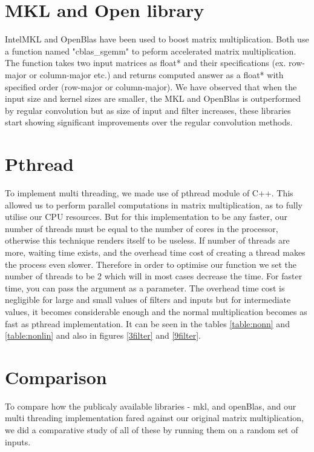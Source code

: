 \documentclass[a4paper]{article}
\begin{document}
\section{MKL and Open library}
IntelMKL and OpenBlas have been used to boost matrix multiplication. Both use a function named "cblas_sgemm" to peform accelerated matrix multiplication. The function takes two input matrices as float* and their specifications (ex. row-major or column-major etc.) and returns computed answer as a float* with specified order (row-major or column-major).
We have observed that when the input size and kernel sizes are smaller, the MKL and OpenBlas is outperformed by regular convolution but as size of input and filter increases, these libraries start showing significant improvements over the regular convolution methods. 




\section{Pthread}
To implement multi threading, we made use of pthread module of C++. This allowed us to perform parallel computations in matrix multiplication, as to fully utilise our CPU resources. But for this implementation to be any faster, our number of threads must be equal to the number of cores in the processor, otherwise this technique renders itself to be useless. If number of threads are more, waiting time exists, and the overhead time cost of creating a thread makes the process even slower. Therefore in order to optimise our function we set the number of threads to be 2 which will in most cases decrease the time. For faster time, you can pass the argument as a parameter.
The overhead time cost is negligible for large and small values of filters and inputs but for intermediate values, it becomes considerable enough and the normal multiplication becomes as fast as pthread implementation. It can be seen in the tables \ref{table:nonn} and \ref{table:nonlin} and also in figures \ref{3filter} and \ref{9filter}.


\section{Comparison}
To compare how the publicaly available libraries - mkl, and openBlas, and our multi threading implementation fared against our original matrix multiplication, we did a comparative study of all of these by running them on a random set of inputs.
\end{document}
